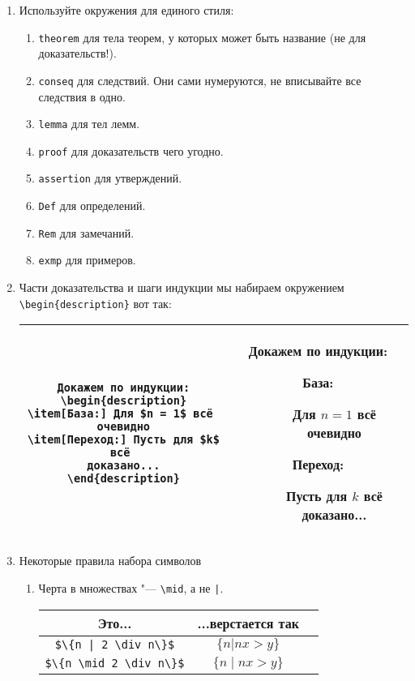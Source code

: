 \begin{enumerate}
\item 
	Используйте окружения для единого стиля:
	\begin{enumerate}
		\item \verb'theorem' для тела теорем, у которых может быть название (не для доказательств!).
		\item \verb'conseq' для следствий. Они сами нумеруются, не вписывайте все следствия в одно.
		\item \verb'lemma' для тел лемм.
		\item \verb'proof' для доказательств чего угодно.
		\item \verb'assertion' для утверждений.
		\item \verb'Def' для определений.
		\item \verb'Rem' для замечаний.
		\item \verb'exmp' для примеров.
	\end{enumerate}

\item 
	Части доказательства и шаги индукции мы набираем окружением \verb'\begin{description}' вот так:
	\begin{center}\begin{tabular}{|c|c|}
		\hline
		\begin{minipage}{8cm}
\begin{verbatim}
Докажем по индукции:
\begin{description}
\item[База:] Для $n = 1$ всё 
очевидно
\item[Переход:] Пусть для $k$ всё 
доказано...
\end{description}
\end{verbatim}
		\end{minipage}
		&
		\begin{minipage}{7cm}
			Докажем по индукции:
			\begin{description}
				\item[База:] Для $n = 1$ всё очевидно
				\item[Переход:] Пусть для $k$ всё доказано...
			\end{description}
		\end{minipage} \\
		\hline
	\end{tabular}\end{center}

\item
	Некоторые правила набора символов
	\begin{enumerate}
	\item 
		Черта в множествах "--- \verb'\mid', а не \verb'|'.
		\begin{center}\begin{tabular}{|c|c|c|}
			\hline Это... & ...верстается так & \\
			\hline \verb'$\{n | 2 \div n\}$' & $\{n | nx > y\}$ \bad \\
			\hline \verb'$\{n \mid 2 \div n\}$' & $\{n \mid nx > y\}$ \ok \\
			\hline
		\end{tabular}\end{center}
	

\end{enumerate}
\end{enumerate}
